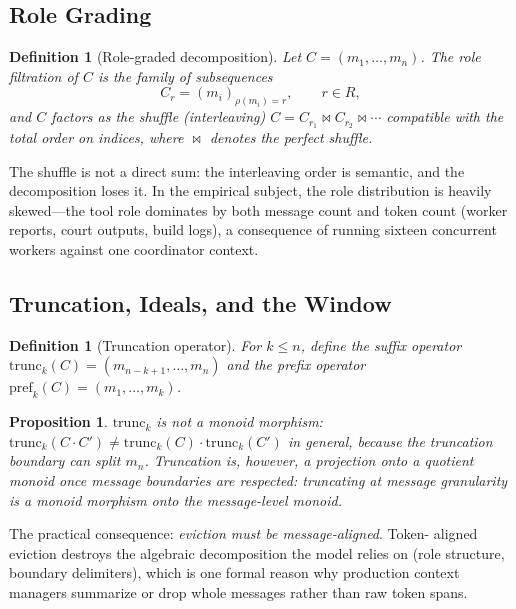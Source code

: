 \documentclass[11pt]{article}
\newtheorem{proposition}[theorem]{Proposition}
\newtheorem{definition}[theorem]{Definition}
\begin{document}
\subsection{Role Grading}

\begin{definition}[Role-graded decomposition]
Let $C = (m_1, \dots, m_n)$. The \emph{role filtration} of $C$ is the family
of subsequences
\[
C_r = (m_i)_{\rho(m_i) = r}, \qquad r \in R,
\]
and $C$ factors as the shuffle (interleaving)
$C = C_{r_1} \bowtie C_{r_2} \bowtie \cdots$ compatible with the total order
on indices, where $\bowtie$ denotes the perfect shuffle.
\end{definition}

The shuffle is not a direct sum: the interleaving order is semantic, and the
decomposition loses it. In the empirical subject, the role distribution is
heavily skewed---the tool role dominates by both message count and token
count (worker reports, court outputs, build logs), a consequence of running
sixteen concurrent workers against one coordinator context.

\subsection{Truncation, Ideals, and the Window}

\begin{definition}[Truncation operator]
For $k \le n$, define the suffix operator
$\mathrm{trunc}_k(C) = (m_{n-k+1}, \dots, m_n)$ and the prefix operator
$\mathrm{pref}_k(C) = (m_1, \dots, m_k)$.
\end{definition}

\begin{proposition}
$\mathrm{trunc}_k$ is not a monoid morphism:
$\mathrm{trunc}_k(C \cdot C') \neq \mathrm{trunc}_k(C) \cdot
\mathrm{trunc}_k(C')$ in general, because the truncation boundary can split
$m_n$. Truncation is, however, a projection onto a quotient monoid once
message boundaries are respected: truncating at message granularity is a
monoid morphism onto the message-level monoid.
\end{proposition}

The practical consequence: \emph{eviction must be message-aligned}. Token-
aligned eviction destroys the algebraic decomposition the model relies on
(role structure, boundary delimiters), which is one formal reason why
production context managers summarize or drop whole messages rather than
raw token spans.
\end{document}
